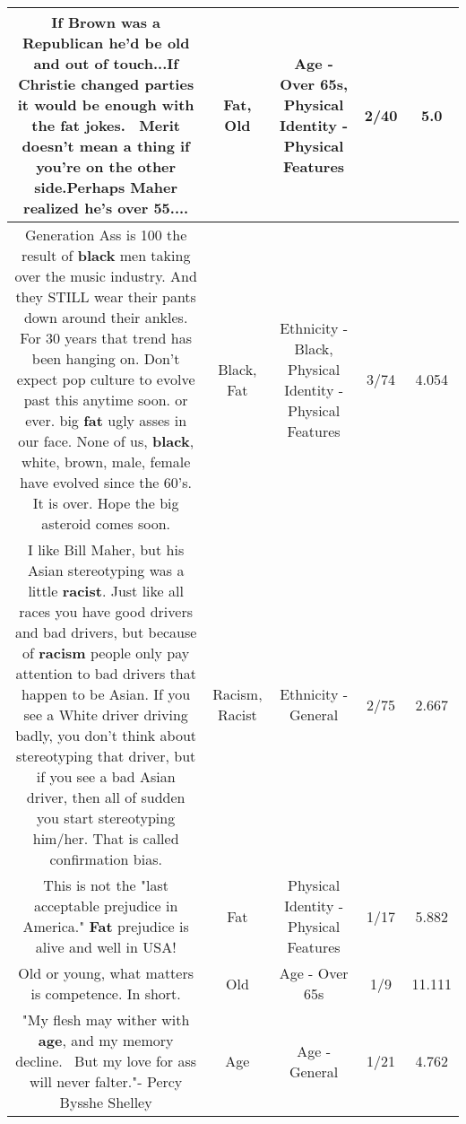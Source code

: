 \documentclass[11pt]{article}
\newlength\mylength
\begin{document}
\begin{center}
\begin{longtable}{|C{.65\mylength}|C{.30\mylength}|C{.12\mylength}|C{.12\mylength}|C{.12\mylength}|}
  \small If Brown was a Republican he'd be \textbf{old} and out of touch...If Christie changed parties it would be enough with the \textbf{fat} jokes.  Merit doesn't mean a thing if you're on the other side.Perhaps Maher realized he's over 55....\normalsize   & Fat, Old & Age - Over 65s, Physical Identity - Physical Features & 2/40 & 5.0 \\  \hline
  \small Generation Ass is 100 the result of \textbf{black} men taking over the music industry. And they STILL wear their pants down around their ankles. For 30 years that trend has been hanging on. Don't expect pop culture to evolve past this anytime soon. or ever. big \textbf{fat} ugly asses in our face. None of us, \textbf{black}, white, brown, male, female have evolved since the 60's. It is over. Hope the big asteroid comes soon.\normalsize   & Black, Fat & Ethnicity - Black, Physical Identity - Physical Features & 3/74 & 4.054 \\  \hline
  \small I like Bill Maher, but his Asian stereotyping was a little \textbf{racist}. Just like all races you have good drivers and bad drivers, but because of \textbf{racism} people only pay attention to bad drivers that happen to be Asian. If you see a White driver driving badly, you don't think about stereotyping that driver, but if you see a bad Asian driver, then all of sudden you start stereotyping him/her. That is called confirmation bias.\normalsize   & Racism, Racist & Ethnicity - General & 2/75 & 2.667 \\  \hline
  \small This is not the "last acceptable prejudice in America." \textbf{Fat} prejudice is alive and well in USA!\normalsize   & Fat & Physical Identity - Physical Features & 1/17 & 5.882 \\  \hline
  \small Old or young, what matters is competence. In short.\normalsize   & Old & Age - Over 65s & 1/9 & 11.111 \\  \hline
  \small "My flesh may wither with \textbf{age}, and my memory decline.  But my love for ass will never falter."- Percy Bysshe Shelley\normalsize   & Age & Age - General & 1/21 & 4.762 \\  \hline

\end{longtable}
\end{center}
\end{document}
